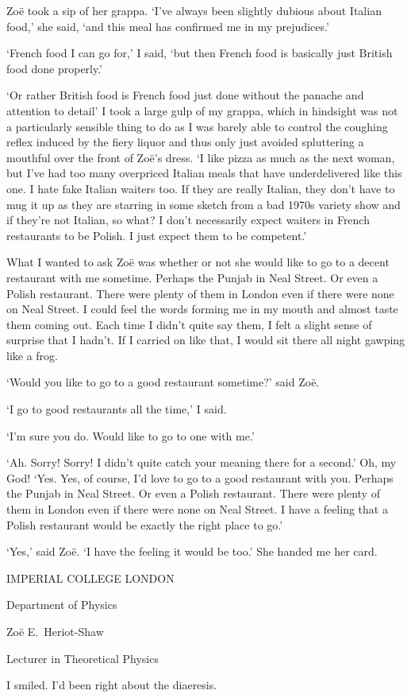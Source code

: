 Zo{\"e} took a sip of
her grappa. `I've always been slightly dubious about Italian food,' she said,
`and this meal has confirmed me in my prejudices.'

`French food I can go for,' I said, `but then French food is
basically just British food done properly.'

`Or rather British food is French food just done without
the panache and attention to detail' I took a large
gulp of my grappa, which in hindsight was not a particularly
sensible thing to do as I was barely able to control the coughing
reflex induced by the fiery liquor and thus only just avoided
spluttering a mouthful over the front of Zo{\"e}'s dress. `I like
pizza as much as the next woman, but I've had too many overpriced
Italian meals that have underdelivered like this one. I hate fake
Italian waiters too. If they are really Italian, they don't have to
mug it up as they are starring in some sketch from a bad 1970s
variety show and if they're not Italian, so what? I don't
necessarily expect waiters in French restaurants to be Polish. I
just expect them to be competent.'

What I wanted to ask Zo{\"e} was whether or not she would like to go
to a decent restaurant with me sometime. Perhaps the Punjab in Neal Street. Or even a Polish restaurant. There were plenty of them in London even if there were none on Neal Street. I could feel the words forming me in my mouth and
almost taste them coming out. Each time I didn't quite say them, I
felt a slight sense of surprise that I hadn't. If I
carried on like that, I would sit there all night gawping like a
frog.

`Would you like to go to a good restaurant sometime?' said Zo{\"e}.

`I go to good restaurants all the time,' I said.

`I'm sure you do. Would like to go to one with {\twelveit me}.'

`Ah. Sorry! Sorry! I didn't quite catch your
meaning there for a second.' Oh, my God! `Yes. Yes, of course, I'd
love to go to a good restaurant with you. Perhaps the Punjab in Neal Street. Or even a Polish restaurant. There were plenty of them in London even if there were none on Neal Street. I have a feeling that a Polish restaurant would be exactly the right place to go.'

`Yes,' said Zo{\"e}. `I have the feeling it would be too.' She handed me her card.

\vskip 1cm

{\twelvess \centerline{IMPERIAL COLLEGE LONDON}

\centerline{Department of Physics}

\centerline{Zo{\"e} E.~Heriot-Shaw}

\centerline{Lecturer in Theoretical Physics}}

\vskip 1cm

I smiled. I'd been right about the diaeresis.
\vfill\eject
